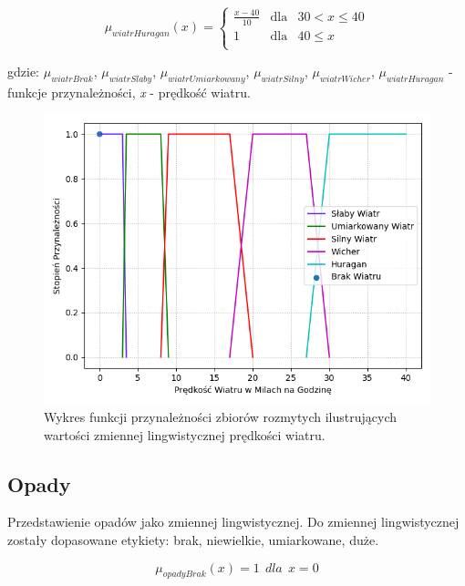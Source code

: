\documentclass{classrep}
\begin{document}
\begin{equation}
\mu _{wiatrHuragan}(x) = \left\{ \begin{array}{rcl}
\frac{x - 40}{10} & \mbox{dla} & 30 < x \leq 40\\
1 & \mbox{dla} & 40 \leq x\\
\end{array}\right.
\end{equation}

gdzie: \(\mu _{wiatrBrak}\), \(\mu _{wiatrSlaby}\), \(\mu _{wiatrUmiarkowany}\), \(\mu _{wiatrSilny}\), \(\mu _{wiatrWicher}\), \(\mu _{wiatrHuragan}\) - funkcje przynależności, \textit{x} - prędkość wiatru.

\begin{figure}[h!]
\centering
\includegraphics[width=14cm]{FunkcjaPrzynaleznosciPredkoscWiatru.png}
\vspace{-0.3cm}
\caption{Wykres funkcji przynależności zbiorów rozmytych ilustrujących wartości zmiennej lingwistycznej prędkości wiatru. }
\label{rysunek do eksperymentu 1 wariantu 1}
\end{figure}
\newpage



\subsection{Opady}
Przedstawienie opadów jako zmiennej lingwistycznej. Do zmiennej lingwistycznej zostały dopasowane etykiety: brak, niewielkie, umiarkowane, duże.

\begin{equation}
\mu _{opadyBrak}(x) = 1 \ \ dla \ \ x = 0
\end{equation}
\end{document}
